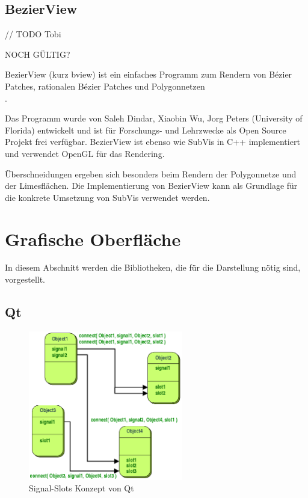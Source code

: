\subsection{BezierView}

// TODO Tobi

NOCH GÜLTIG?

BezierView (kurz bview) ist ein einfaches Programm zum Rendern von Bézier Patches, rationalen Bézier Patches und Polygonnetzen 
\\\cite{Peters.bview.27.07.2015}.

Das Programm wurde von Saleh Dindar, Xiaobin Wu, Jorg Peters (University of Florida) entwickelt und ist für Forschungs- und Lehrzwecke als Open Source Projekt frei verfügbar. BezierView ist ebenso wie SubVis in C++ implementiert und verwendet OpenGL für das Rendering.

Überschneidungen ergeben sich besonders beim Rendern der Polygonnetze und der Limesflächen. Die Implementierung von BezierView kann als Grundlage für die konkrete Umsetzung von SubVis verwendet werden.


\section{Grafische Oberfläche}

In diesem Abschnitt werden die Bibliotheken, die für die Darstellung nötig sind, vorgestellt.

\subsection{Qt} 

\begin{figure}[hp]
  \centering
  \includegraphics[width=0.6\textwidth]{content/media/qt_signal}
  \caption{Signal-Slots Konzept von Qt \cite{Qt}}
  \label{fig:qt_signal}
\end{figure}

